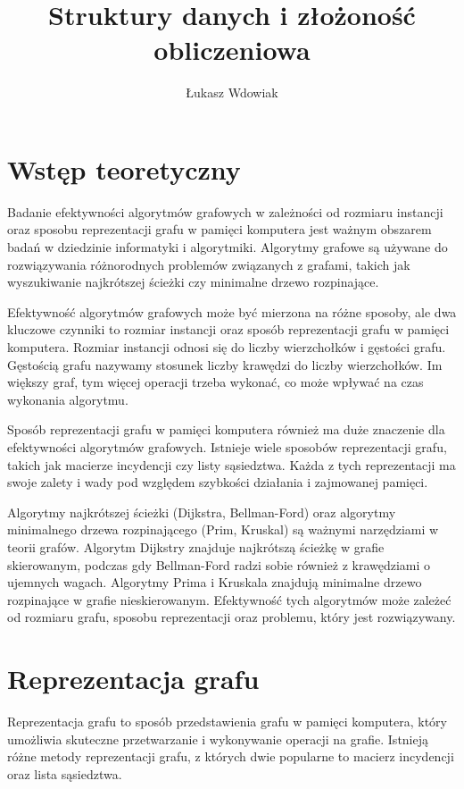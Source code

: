 \documentclass[11pt]{article}
\begin{document}
\title{Struktury danych i złożoność obliczeniowa}
\author{Łukasz Wdowiak}


\section{Wstęp teoretyczny}
Badanie efektywności algorytmów grafowych w zależności od rozmiaru instancji oraz sposobu reprezentacji grafu w pamięci komputera jest ważnym obszarem badań w dziedzinie informatyki i algorytmiki.
Algorytmy grafowe są używane do rozwiązywania różnorodnych problemów związanych z grafami, takich jak wyszukiwanie najkrótszej ścieżki czy minimalne drzewo rozpinające.

Efektywność algorytmów grafowych może być mierzona na różne sposoby, ale dwa kluczowe czynniki to rozmiar instancji oraz sposób reprezentacji grafu w pamięci komputera.
Rozmiar instancji odnosi się do liczby wierzchołków i gęstości grafu. Gęstością grafu nazywamy stosunek liczby krawędzi do liczby wierzchołków.
Im większy graf, tym więcej operacji trzeba wykonać, co może wpływać na czas wykonania algorytmu.

Sposób reprezentacji grafu w pamięci komputera również ma duże znaczenie dla efektywności algorytmów grafowych.
Istnieje wiele sposobów reprezentacji grafu, takich jak macierze incydencji czy listy sąsiedztwa.
Każda z tych reprezentacji ma swoje zalety i wady pod względem szybkości działania i zajmowanej pamięci.

Algorytmy najkrótszej ścieżki (Dijkstra, Bellman-Ford) oraz algorytmy minimalnego drzewa rozpinającego (Prim, Kruskal) są ważnymi narzędziami w teorii grafów.
Algorytm Dijkstry znajduje najkrótszą ścieżkę w grafie skierowanym, podczas gdy Bellman-Ford radzi sobie również z krawędziami o ujemnych wagach. Algorytmy Prima i Kruskala znajdują minimalne drzewo rozpinające w grafie nieskierowanym.
Efektywność tych algorytmów może zależeć od rozmiaru grafu, sposobu reprezentacji oraz problemu, który jest rozwiązywany.

\section{Reprezentacja grafu}
Reprezentacja grafu to sposób przedstawienia grafu w pamięci komputera, który umożliwia skuteczne przetwarzanie i wykonywanie operacji na grafie.
Istnieją różne metody reprezentacji grafu, z których dwie popularne to macierz incydencji oraz lista sąsiedztwa.
\end{document}
